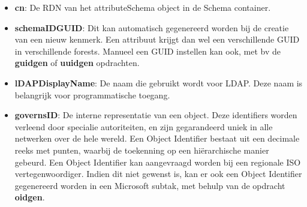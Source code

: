 \begin{enumerate}
		 { 
			\begin{itemize}
				\item \textbf{cn}: De RDN van het attributeSchema object in de Schema container.
				\item \textbf{schemaIDGUID}: Dit kan automatisch gegenereerd worden bij de creatie van een nieuw kenmerk. Een attribuut krijgt dan wel een verschillende GUID in verschillende forests. Manueel een GUID instellen kan ook, met bv de \textbf{guidgen} of \textbf{uuidgen} opdrachten.
				\item \textbf{lDAPDisplayName}: De naam die gebruikt wordt voor LDAP. Deze naam is belangrijk voor programmatische toegang.
				\item \textbf{governsID}: De interne representatie van een object. Deze identifiers worden verleend door specialie autoriteiten, en zijn gegarandeerd uniek in alle netwerken over de hele wereld. Een Object Identifier bestaat uit een decimale reeks met punten, waarbij de toekenning op een hiërarchische manier gebeurd. Een Object Identifier kan aangevraagd worden bij een regionale ISO vertegenwoordiger. Indien dit niet gewenst is, kan er ook een Object Identifier gegenereerd worden in een Microsoft subtak, met behulp van de opdracht \textbf{oidgen}.
			\end{itemize}
		}
		

\end{enumerate}
